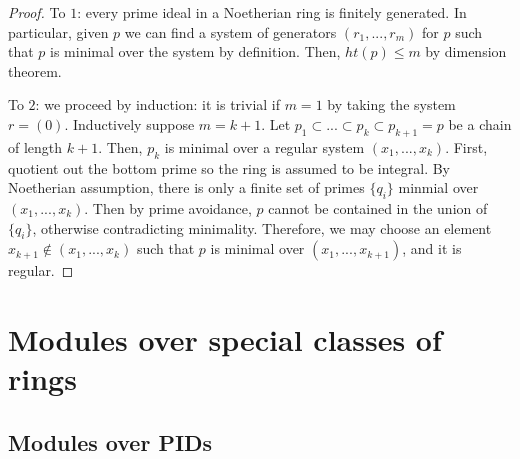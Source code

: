 \documentclass{article}
\theoremstyle{definition}
\theoremstyle{definition}
\theoremstyle{definition}
\theoremstyle{definition}
\theoremstyle{definition}
\theoremstyle{definition}
\theoremstyle{definition}
\begin{document}
\begin{proof}
    To $1$: every prime ideal in a Noetherian ring is finitely generated. In particular, given $p$ we can find a system of generators $(r_1,...,r_m)$ for $p$ such that $p$ is minimal over the system by definition. Then, $ht(p)\leq m$ by dimension theorem.

    To $2$: we proceed by induction: it is trivial if $m=1$ by taking the system $r=(0)$. Inductively suppose $m=k+1$. Let $p_1\subset...\subset p_k\subset p_{k+1}=p$ be a chain of length $k+1$. Then, $p_k$ is minimal over a regular system $(x_1,...,x_k)$. First, quotient out the bottom prime so the ring is assumed to be integral. By Noetherian assumption, there is only a finite set of primes $\{q_i\}$ minmial over $(x_1,...,x_k)$. Then by prime avoidance, $p$ cannot be contained in the union of $\{q_i\}$, otherwise contradicting minimality. Therefore, we may choose an element $x_{k+1}\not \in (x_1,...,x_k)$ such that $p$ is minimal over $(x_1,...,x_{k+1})$, and it is regular. 

\end{proof}

\section{Modules over special classes of rings}
\subsection{Modules over PIDs}
\end{document}
